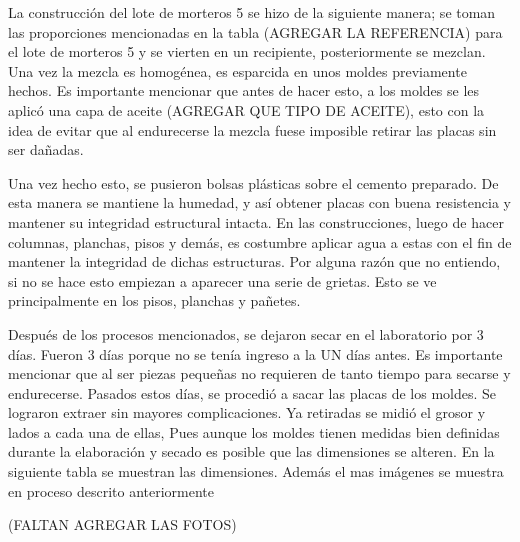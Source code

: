 \vspace{5mm}

La construcción del lote de morteros 5 se hizo de la siguiente manera; se toman las proporciones mencionadas en la tabla (AGREGAR LA REFERENCIA) para el lote de morteros 5 y se vierten en un recipiente, posteriormente se mezclan. Una vez la mezcla es homogénea, es esparcida en unos moldes previamente hechos. Es importante mencionar que antes de hacer esto, a los moldes se les aplicó una capa de aceite (AGREGAR QUE TIPO DE ACEITE), esto con la idea de evitar que al endurecerse la mezcla fuese imposible retirar las placas sin ser dañadas.

\vspace{5mm}

Una vez hecho esto, se pusieron bolsas plásticas sobre el cemento preparado. De esta manera se mantiene la humedad, y así obtener placas con buena resistencia y mantener su integridad estructural intacta. En las construcciones, luego de hacer columnas, planchas, pisos y demás, es costumbre aplicar agua a estas con el fin de mantener la integridad de dichas estructuras. Por alguna razón que no entiendo, si no se hace esto empiezan a aparecer una serie de grietas. Esto se ve principalmente en los pisos, planchas y pañetes. 


\vspace{5mm}

Después de los procesos mencionados, se dejaron secar en el laboratorio por 3 días. Fueron 3 días porque no se tenía ingreso a la UN días antes. Es importante mencionar que al ser piezas pequeñas no requieren de tanto tiempo para secarse y endurecerse. Pasados estos días, se procedió a sacar las placas de los moldes. Se lograron extraer sin mayores complicaciones. 
Ya retiradas se midió el grosor y lados a cada una de ellas, Pues aunque los moldes tienen medidas bien definidas durante la elaboración y secado es posible que las dimensiones se alteren. En la siguiente tabla se muestran las dimensiones. Además el mas imágenes se muestra en proceso descrito anteriormente 

(FALTAN AGREGAR LAS FOTOS)